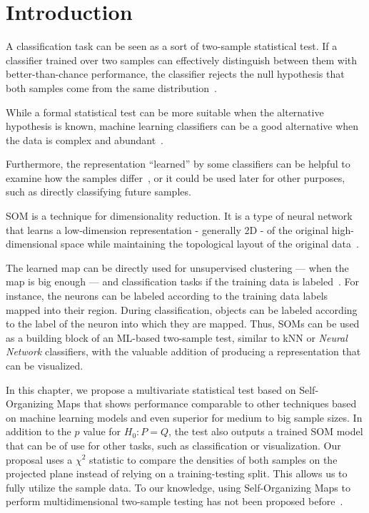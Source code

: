 
\section{Introduction}

A classification task can be seen as a sort of two-sample statistical test.
If a classifier trained over two samples can effectively distinguish between
them with better-than-chance performance, the classifier rejects the null
hypothesis that both samples come from the same distribution~\cite{friedman2004multivariate}.

While a formal statistical test can be more suitable when the alternative
hypothesis is known, machine learning classifiers can be a good alternative
when the data is complex and abundant~\cite{kirchler2020two,kim2021classification,pmlr-v119-liu20m}.

Furthermore, the representation ``learned'' by some classifiers can be helpful
to examine how the samples differ~\cite{friedman2004multivariate,lopez2016revisiting},
or it could be used later for other purposes, such as directly classifying future samples.

\medskip

\gls{SOM} is a technique for dimensionality
reduction. It is a type of neural network that learns a low-dimension representation
- generally 2D - of the original high-dimensional space while maintaining the topological
layout of the original data~\cite{kohonen1982self, Villmann1999}.

The learned map can be directly used for unsupervised clustering --- when the map is big enough ---
and classification tasks if the training data is labeled~\cite{ultsch2005esom,ultsch2007emergence}.
For instance, the neurons can be labeled according to the training data labels mapped into their
region. During classification, objects can be labeled according to the label of the neuron
into which they are mapped.
Thus, \glspl{SOM} can be used as a building block of an ML-based two-sample test, similar to
\gls{kNN} or \emph{Neural Network} classifiers, with the valuable addition
of producing a representation that can be visualized.

In this chapter, we propose a multivariate statistical test based on
Self-Organizing Maps that shows performance comparable to other techniques based on 
machine learning models and even superior for medium to big sample sizes. In addition to the 
$p$ value for $H_0: P = Q$, the test also outputs a trained \gls{SOM} model that can be of
use for other tasks, such as classification or visualization.
Our proposal uses a $\chi^2$ statistic to compare the densities of both samples on
the projected plane instead of relying on a training-testing split. This allows us to fully
utilize the sample data. To our knowledge, using Self-Organizing Maps
to perform multidimensional two-sample testing has not been proposed
before~\cite{kaski1998bibliography,oja_bibliography_2003,polla_bibliography_2006}.

